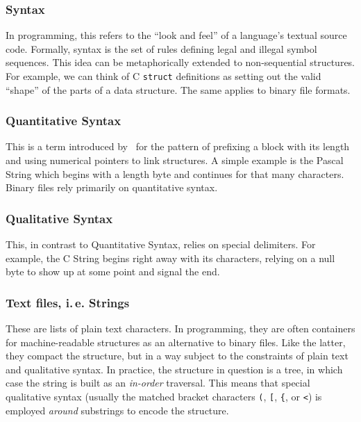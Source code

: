 \documentclass[ twoside,openright,titlepage,numbers=noenddot,headinclude,footinclude,cleardoublepage=empty,abstract=on,
                BCOR=5mm,paper=a4,fontsize=11pt
                ]{scrreprt}
\newcommand{\ie}{i.\,e.}
\theoremstyle{definition}
\begin{document}
\hypertarget{syntax}{\subsubsection{Syntax}\label{syntax}}

In programming, this refers to the ``look and feel'' of a language's
textual source code. Formally, syntax is the set of rules defining legal
and illegal symbol sequences. This idea can be metaphorically extended
to non-sequential structures. For example, we can think of C
\texttt{struct} definitions as setting out the valid ``shape'' of the
parts of a data structure. The same applies to binary file formats.

\hypertarget{quantitative-syntax}{\subsubsection{Quantitative Syntax}\label{quantitative-syntax}}

This is a term introduced by~\parencite[p.\ 13]{Infra} for the pattern
of prefixing a block with its length and using numerical pointers to
link structures. A simple example is the Pascal String which begins with
a length byte and continues for that many characters. Binary files rely
primarily on quantitative syntax.

\hypertarget{qualitative-syntax}{\subsubsection{Qualitative Syntax}\label{qualitative-syntax}}

This, in contrast to Quantitative Syntax, relies on special delimiters.
For example, the C String begins right away with its characters, relying
on a null byte to show up at some point and signal the end.

\hypertarget{text-files-strings}{\subsubsection{\texorpdfstring{Text files, \ie{}
Strings}{Text files,  Strings}}\label{text-files-strings}}

These are lists of plain text characters. In programming, they are often
containers for machine-readable structures as an alternative to binary
files. Like the latter, they compact the structure, but in a way subject
to the constraints of plain text and qualitative syntax. In practice,
the structure in question is a tree, in which case the string is built
as an \emph{in-order} traversal. This means that special qualitative
syntax (usually the matched bracket characters \texttt{(}, \texttt{{[}},
\texttt{\{}, or \texttt{\textless{}}) is employed \emph{around}
substrings to encode the structure.
\end{document}
